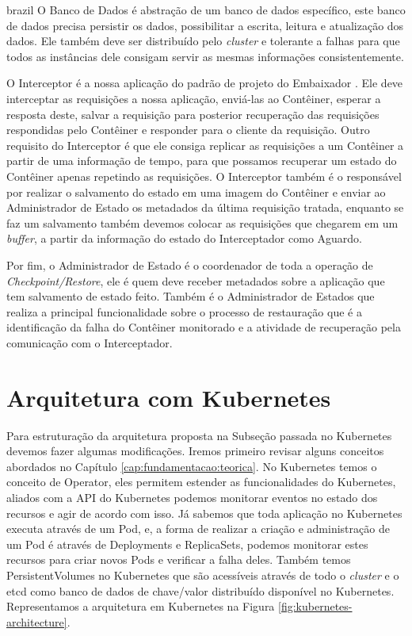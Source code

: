 \begin{otherlanguage*}{brazil}
O Banco de Dados é abstração de um banco de dados específico, este banco de dados precisa
persistir os dados, possibilitar a escrita, leitura e atualização dos dados. Ele também
deve ser distribuído pelo \textit{cluster} e tolerante a falhas para que todos as instâncias
dele consigam servir as mesmas informações consistentemente.

O Interceptor é a nossa aplicação do padrão de projeto do Embaixador \cite{ambassador}. Ele
deve interceptar as requisições a nossa aplicação, enviá-las ao Contêiner, esperar a resposta
deste, salvar a requisição para posterior recuperação das requisições respondidas pelo
Contêiner e responder para o cliente da requisição. Outro requisito do Interceptor é que ele
consiga replicar as requisições a um Contêiner a partir de uma informação de tempo, para que
possamos recuperar um estado do Contêiner apenas repetindo as requisições. O Interceptor também
é o responsável por realizar o salvamento do estado em uma imagem do Contêiner e enviar ao
Administrador de Estado os metadados da última requisição tratada, enquanto se faz um salvamento
também devemos colocar as requisições que chegarem em um \textit{buffer}, a partir da informação
do estado do Interceptador como Aguardo.

Por fim, o Administrador de Estado é o coordenador de toda a operação de
\textit{Checkpoint/Restore}, ele é quem deve receber metadados sobre a aplicação que tem salvamento
de estado feito. Também é o Administrador de Estados que realiza a principal funcionalidade sobre
o processo de restauração que é a identificação da falha do Contêiner monitorado e a atividade de
recuperação pela comunicação com o Interceptador.

\section{Arquitetura com Kubernetes} \label{subsection:kubernetes-architecture}

Para estruturação da arquitetura proposta na Subseção passada no Kubernetes devemos
fazer algumas modificações. Iremos primeiro revisar alguns conceitos abordados no
Capítulo \ref{cap:fundamentacao:teorica}. No Kubernetes temos o conceito de Operator,
eles permitem estender as funcionalidades do Kubernetes, aliados com a API do
Kubernetes podemos monitorar eventos no estado dos recursos e agir de acordo com isso.
Já sabemos que toda aplicação no Kubernetes executa através de um Pod, e, a forma de
realizar a criação e administração de um Pod é através de Deployments e ReplicaSets,
podemos monitorar estes recursos para criar novos Pods e verificar a falha deles.
Também temos PersistentVolumes no Kubernetes que são acessíveis através de todo o
\textit{cluster} e o etcd como banco de dados de chave/valor distribuído disponível
no Kubernetes. Representamos a arquitetura em Kubernetes na Figura
\ref{fig:kubernetes-architecture}.


\end{otherlanguage*}
